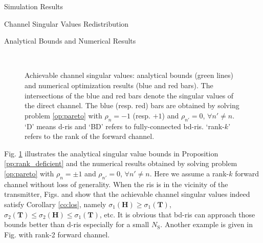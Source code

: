 \documentclass[journal]{IEEEtran}
\begin{document}
\begin{section}{Simulation Results}
\begin{subsection}{Channel Singular Values Redistribution}
		\begin{subsubsection}{Analytical Bounds and Numerical Results}
			\begin{figure}[!t]
				\centering
				\\
				\caption{
					Achievable channel singular values: analytical bounds (green lines) and numerical optimization results (blue and red bars).
					The intersections of the blue and red bars denote the singular values of the direct channel.
					The blue (resp. red) bars are obtained by solving problem \eqref{op:pareto} with $\rho_n = -1$ (resp. $+1$) and $\rho_{n'} = 0$, $\forall n' \ne n$.
					`D' means \gls{d}-\gls{ris} and `BD' refers to fully-connected \gls{bd}-\gls{ris}.
					`rank-$k$' refers to the rank of the forward channel.
				}
				\label{fg:singular_bound}
			\end{figure}
			Fig. \ref{fg:singular_bound} illustrates the analytical singular value bounds in Proposition \ref{pp:rank_deficient} and the numerical results obtained by solving problem \eqref{op:pareto} with $\rho_n = \pm 1$ and $\rho_{n'} = 0$, $\forall n' \ne n$.
			Here we assume a rank-$k$ forward channel without loss of generality.
			When the \gls{ris} is in the vicinity of the transmitter, Figs.  and  show that the achievable channel singular values indeed satisfy Corollary \ref{co:los}, namely $\sigma_1(\mathbf{H}) \ge \sigma_1(\mathbf{T})$, $\sigma_2(\mathbf{T}) \le \sigma_2(\mathbf{H}) \le \sigma_1(\mathbf{T})$, etc.
			It is obvious that \gls{bd}-\gls{ris} can approach those bounds better than \gls{d}-\gls{ris} especially for a small $N_\mathrm{S}$.
			Another example is given in Fig.  with rank-2 forward channel.

\end{subsubsection}
\end{subsection}
\end{section}
\end{document}
